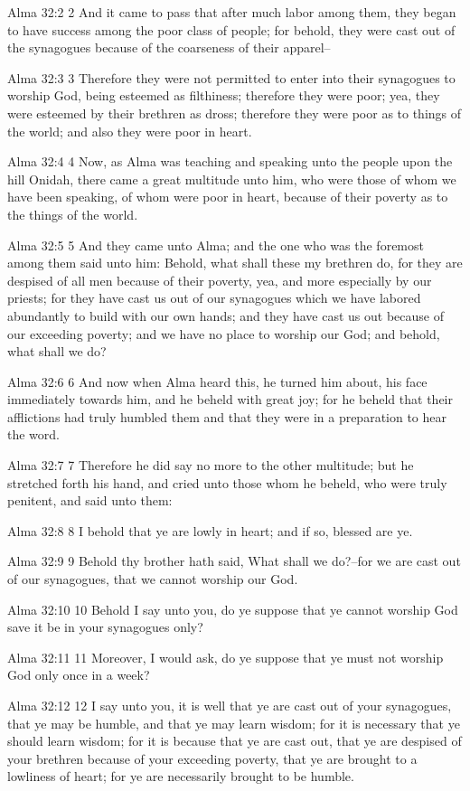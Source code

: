 Alma 32:2
 2 And it came to pass that after much labor among them, they
began to have success among the poor class of people; for behold,
they were cast out of the synagogues because of the coarseness of
their apparel--

Alma 32:3
 3 Therefore they were not permitted to enter into their
synagogues to worship God, being esteemed as filthiness;
therefore they were poor; yea, they were esteemed by their
brethren as dross; therefore they were poor as to things of the
world; and also they were poor in heart.

Alma 32:4
 4 Now, as Alma was teaching and speaking unto the people upon
the hill Onidah, there came a great multitude unto him, who were
those of whom we have been speaking, of whom were poor in heart,
because of their poverty as to the things of the world.

Alma 32:5
 5 And they came unto Alma; and the one who was the foremost
among them said unto him: Behold, what shall these my brethren
do, for they are despised of all men because of their poverty,
yea, and more especially by our priests; for they have cast us
out of our synagogues which we have labored abundantly to build
with our own hands; and they have cast us out because of our
exceeding poverty; and we have no place to worship our God; and
behold, what shall we do?

Alma 32:6
 6 And now when Alma heard this, he turned him about, his face
immediately towards him, and he beheld with great joy; for he
beheld that their afflictions had truly humbled them and that
they were in a preparation to hear the word.

Alma 32:7
 7 Therefore he did say no more to the other multitude; but he
stretched forth his hand, and cried unto those whom he beheld,
who were truly penitent, and said unto them:

Alma 32:8
 8 I behold that ye are lowly in heart; and if so, blessed are
ye.

Alma 32:9
 9 Behold thy brother hath said, What shall we do?--for we are
cast out of our synagogues, that we cannot worship our God.

Alma 32:10
 10 Behold I say unto you, do ye suppose that ye cannot worship
God save it be in your synagogues only?

Alma 32:11
 11 Moreover, I would ask, do ye suppose that ye must not worship
God only once in a week?

Alma 32:12
 12 I say unto you, it is well that ye are cast out of your
synagogues, that ye may be humble, and that ye may learn wisdom;
for it is necessary that ye should learn wisdom; for it is
because that ye are cast out, that ye are despised of your
brethren because of your exceeding poverty, that ye are brought
to a lowliness of heart; for ye are necessarily brought to be
humble.

